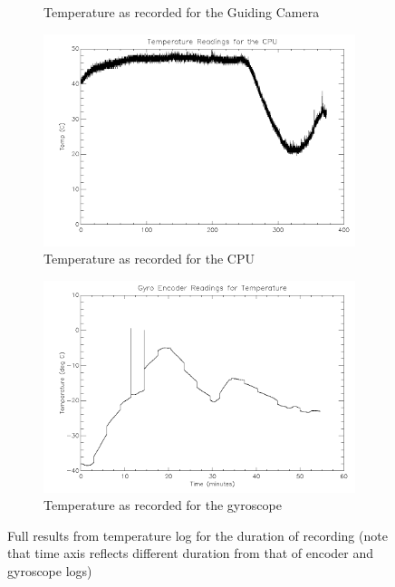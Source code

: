 \begin{figure}[htbp]
\begin{subfigure}{0.45\textwidth}
		\caption{Temperature as recorded for the Guiding Camera}
		\label{fig:sub:GCTemp}
	\end{subfigure}
	\begin{subfigure}{0.45\textwidth}
		\includegraphics[width=1\linewidth]{appendix/img/campaign_results/tempcpu.png}
		\caption{Temperature as recorded for the CPU}
		\label{fig:sub:cputemp}
	\end{subfigure}
	\begin{subfigure}{0.45\textwidth}
		\includegraphics[width=1\linewidth]{appendix/img/campaign_results/gyrotemp.png}
		\caption{Temperature as recorded for the gyroscope}
		\label{fig:sub:gyrotemp}
	\end{subfigure}	
	\caption{Full results from temperature log for the duration of recording (note that time axis reflects different duration from that of encoder and gyroscope logs)}
	\label{fig:temp}
\end{figure}

